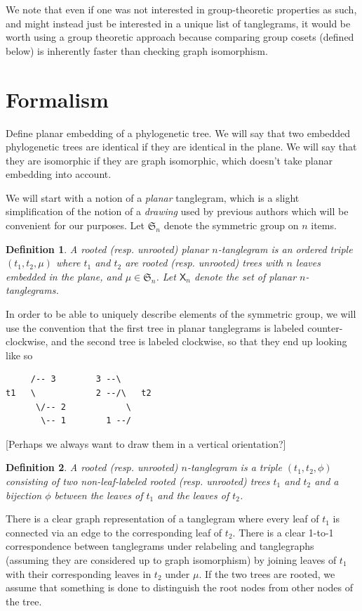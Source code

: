 \documentclass{amsart}
\newtheorem{definition}{Definition}
\newcommand{\fS}{\mathfrak S}
\newcommand{\pairing}{\mu}
\newcommand{\ptangle}{\mathsf{X}}
\begin{document}
We note that even if one was not interested in group-theoretic properties as such, and might instead just be interested in a unique list of tanglegrams, it would be worth using a group theoretic approach because comparing group cosets (defined below) is inherently faster than checking graph isomorphism.

\section{Formalism}
Define planar embedding of a phylogenetic tree.
We will say that two embedded phylogenetic trees are identical if they are identical in the plane.
We will say that they are isomorphic if they are graph isomorphic, which doesn't take planar embedding into account.

We will start with a notion of a \emph{planar} tanglegram, which is a slight simplification of the notion of a \emph{drawing} used by previous authors \cite{Venkatachalam2010-zh} which will be convenient for our purposes.
Let $\fS_n$ denote the symmetric group on $n$ items.
\begin{definition}
\label{def:ptanglegram}
A rooted (resp. unrooted) \emph{planar $n$-tanglegram} is an ordered triple $(t_1, t_2, \pairing)$ where $t_1$ and $t_2$ are rooted (resp. unrooted) trees with $n$ leaves embedded in the plane, and $\pairing \in \fS_n$.
Let $\ptangle_n$ denote the set of planar $n$-tanglegrams.
\end{definition}

In order to be able to uniquely describe elements of the symmetric group, we will use the convention that the first tree in planar tanglegrams is labeled counter-clockwise, and the second tree is labeled clockwise, so that they end up looking like so

\begin{verbatim}
     /-- 3        3 --\
t1   \            2 --/\   t2
      \/-- 2            \
       \-- 1        1 --/
\end{verbatim}

[Perhaps we always want to draw them in a vertical orientation?]

\begin{definition}
\label{def:tanglegram}
A rooted (resp. unrooted) $n$-\emph{tanglegram} is a triple $(t_1, t_2, \phi)$ consisting of two non-leaf-labeled rooted (resp. unrooted) trees $t_1$ and $t_2$ and a bijection $\phi$ between the leaves of $t_1$ and the leaves of $t_2$.
\end{definition}
There is a clear graph representation of a tanglegram where every leaf of $t_1$ is connected via an edge to the corresponding leaf of $t_2$.
There is a clear 1-to-1 correspondence between tanglegrams under relabeling and tanglegraphs (assuming they are considered up to graph isomorphism) by joining leaves of $t_1$ with their corresponding leaves in $t_2$ under $\pairing$.
If the two trees are rooted, we assume that something is done to distinguish the root nodes from other nodes of the tree.
\end{document}
